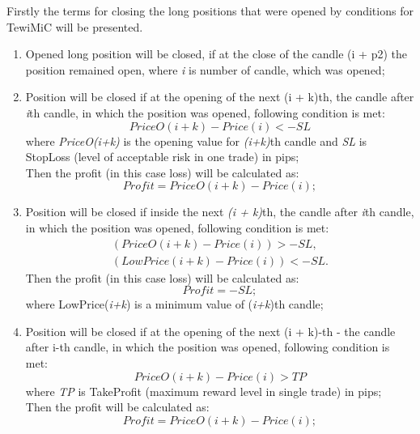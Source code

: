 \documentclass{tewiart}
\begin{document}
\noindent Firstly the terms for closing the long positions that were opened by conditions for TewiMiC will be presented.
\begin{enumerate}
\item Opened long position will be closed, if at the close of the candle (i + p2) the position remained open, where \textit{i} is number of candle, which was opened;

\item Position will be closed if at the opening of the next (i + k)th, the candle after \textit{i}th candle, in which the position was opened, following condition is met: 
\begin{equation}
PriceO(i+k)-Price(i) <-SL
\end{equation} 
where \textit{PriceO(i+k)} is the opening value for \textit{(i+k)}th candle and \textit{SL} is StopLoss (level of acceptable risk in one trade) in pips;\\
Then the profit (in this case loss) will be calculated as:
\begin{equation}
Profit =PriceO (i+k)-Price(i);
\end{equation}

\item Position will be closed if inside the next \textit{(i + k)}th, the candle after \textit{i}th candle, in which the position was opened, following condition is met: 
\begin{equation}
\begin{split}
(PriceO(i+k)-Price(i) )>-SL,\\
(LowPrice(i+k)-Price(i))<-SL.
\end{split}
\end{equation} 
Then the profit (in this case loss) will be calculated as:
\begin{equation}
Profit =-SL;
\end{equation}
where LowPrice(\textit{i+k}) is a minimum value of (\textit{i+k})th candle;

\item Position will be closed if at the opening of the next (i + k)-th - the candle after i-th candle, in which the position was opened, following condition is met: 
\begin{equation}
PriceO(i+k)-Price(i)>TP
\end{equation} 
where \textit{TP} is TakeProfit (maximum reward level in single trade) in pips;\\
Then the profit will be calculated as:
\begin{equation}
Profit =PriceO (i+k)-Price(i);
\end{equation}


\end{enumerate}
\end{document}
